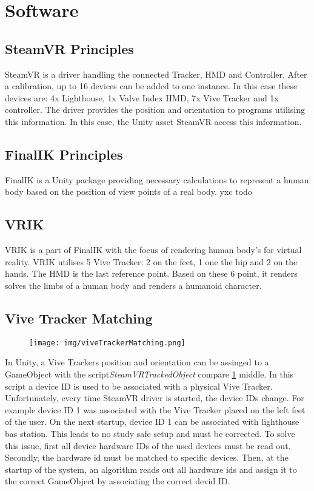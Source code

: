 \section{Software}
\subsection{SteamVR Principles}
SteamVR is a driver handling the connected Tracker, HMD and Controller. After a calibration, up to 16 devices can be added to one instance. In this case these devices are: 4x Lighthouse, 1x Valve Index HMD, 7x Vive Tracker and 1x controller. The driver provides the position and orientation to programs utilising this information. In this case, the Unity asset SteamVR access this information.
\subsection{FinalIK Principles}
FinalIK is a Unity package providing necessary calculations to represent a human body based on the position of view points of a real body. yxc todo
\subsection{VRIK}
VRIK is a part of FinalIK with the focus of rendering human body's for virtual reality. VRIK utilises 5 Vive Tracker: 2 on the feet, 1 one the hip and 2 on the hands. The HMD is the last reference point. Based on these 6 point, it renders solves the limbs of a human body and renders a humanoid character. %
\subsection{Vive Tracker Matching}
\begin{figure}
	\centering
	\texttt{[image: img/viveTrackerMatching.png]}
	\caption{}
	\label{fig:viveTrackerMatching}
\end{figure}
In Unity, a Vive Trackers position and orientation can be assinged to a GameObject with the script\textit{SteamVRTrackedObject} compare \ref{fig:viveTrackerMatching} middle. In this script a device ID is used to be associated with a physical Vive Tracker. Unfortunately, every time SteamVR driver is started, the device IDs change. For example device ID 1 was associated with the Vive Tracker placed on the left feet of the user. On the next startup, device ID 1 can be associated with lighthouse bas station. This leads to no study safe setup and must be corrected. To solve this issue, first all device hardware IDs of the used devices must be read out. Secondly, the hardware id must be matched to specific devices. Then, at the startup of the system, an algorithm reads out all hardware ids and assign it to the correct GameObject by associating the correct devid ID. 

